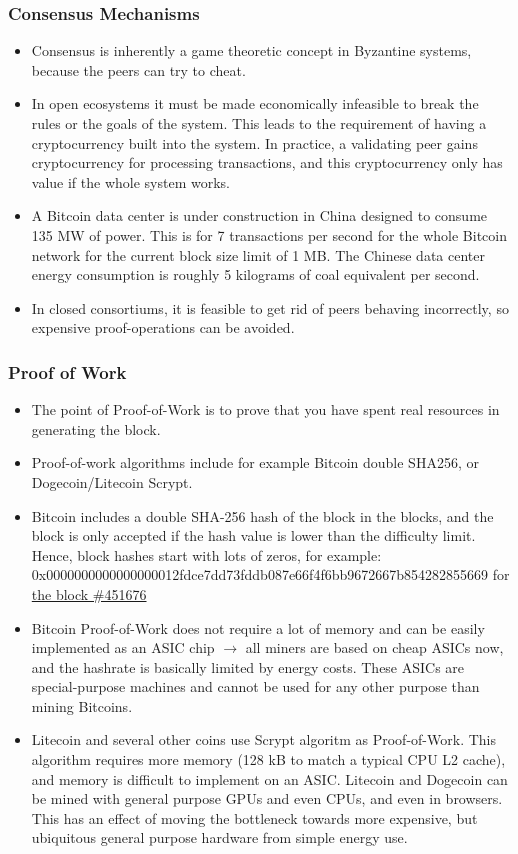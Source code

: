 \documentclass[8pt]{beamer}
\begin{document}
\begin{frame}
\frametitle{Consensus Mechanisms}

\begin{itemize}
 \item Consensus is inherently a game theoretic concept in Byzantine systems, because the peers can try to cheat.
 \item In open ecosystems it must be made economically infeasible to break the rules or the goals of the system. This leads to the requirement of having a cryptocurrency built into the system.
       In practice, a validating peer gains cryptocurrency for processing transactions, and this cryptocurrency only has value if the whole system works.
 \item A Bitcoin data center is under construction in China designed to consume 135 MW of power. This is for 7 transactions per second for the whole Bitcoin network for the current block size limit of 1 MB.
       The Chinese data center energy consumption is roughly 5 kilograms of coal equivalent per second.
 \item In closed consortiums, it is feasible to get rid of peers behaving incorrectly, so expensive proof-operations can be avoided.
\end{itemize}
\end{frame}

\begin{frame}
\frametitle{Proof of Work}

\begin{itemize}
 \item The point of Proof-of-Work is to prove that you have spent real resources in generating the block.
 \item Proof-of-work algorithms include for example Bitcoin double SHA256, or Dogecoin/Litecoin Scrypt.
 \item Bitcoin includes a double SHA-256 hash of the block in the blocks, and the block is only accepted if the hash value is lower than the difficulty limit. Hence, block hashes start with lots of zeros, for example:
       0x0000000000000000012fdce7dd73fddb087e66f4f6bb9672667b854282855669 for \href{https://blockexplorer.com/block/0000000000000000012fdce7dd73fddb087e66f4f6bb9672667b854282855669}{the block \#451676}
 \item Bitcoin Proof-of-Work does not require a lot of memory and can be easily implemented as an ASIC chip $ \rightarrow $ all miners are based on cheap ASICs now, and the hashrate is basically limited by energy costs.
       These ASICs are special-purpose machines and cannot be used for any other purpose than mining Bitcoins.
 \item Litecoin and several other coins use Scrypt algoritm as Proof-of-Work. This algorithm requires more memory (128 kB to match a typical CPU L2 cache), and memory is difficult to implement on an ASIC.
       Litecoin and Dogecoin can be mined with general purpose GPUs and even CPUs, and even in browsers. This has an effect of moving the bottleneck towards more expensive, but ubiquitous general purpose hardware
       from simple energy use.
\end{itemize}
\end{frame}
\end{document}
